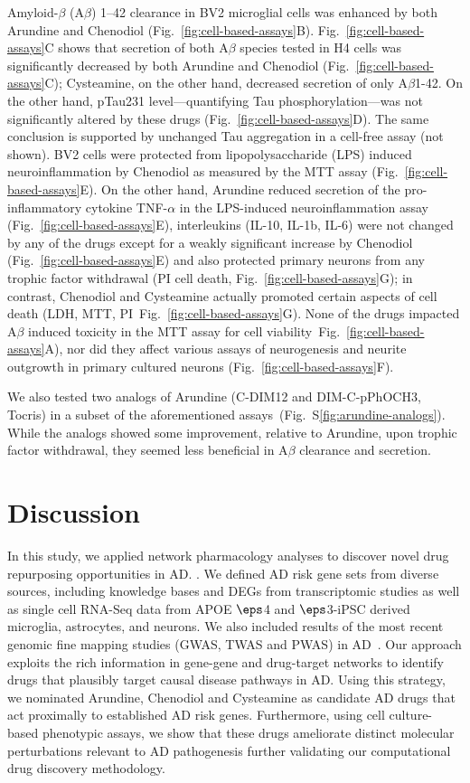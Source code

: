 \documentclass[letterpaper]{article}
\begin{document}
Amyloid-$\beta$ (A$\beta$) 1--42 clearance in BV2 microglial cells was
enhanced by both Arundine and Chenodiol (Fig.~\ref{fig:cell-based-assays}B).
Fig.~\ref{fig:cell-based-assays}C shows that secretion of both A$\beta$
species tested in H4 cells was significantly decreased by both Arundine and
Chenodiol (Fig.~\ref{fig:cell-based-assays}C); Cysteamine, on the other hand,
decreased secretion of only A$\beta$1-42.  On the other hand, pTau231
level---quantifying Tau phosphorylation---was not significantly altered by
these drugs (Fig.~\ref{fig:cell-based-assays}D).  The same conclusion is
supported by unchanged Tau aggregation in a cell-free assay (not shown). BV2
cells were protected from lipopolysaccharide (LPS) induced neuroinflammation
by Chenodiol as measured by the MTT assay (Fig.~\ref{fig:cell-based-assays}E).
On the other hand, Arundine reduced secretion of the pro-inflammatory cytokine
TNF-$\alpha$ in the LPS-induced neuroinflammation assay
(Fig.~\ref{fig:cell-based-assays}E), interleukins (IL-10, IL-1b, IL-6) were
not changed by any of the drugs except for a weakly significant increase by
Chenodiol (Fig.~\ref{fig:cell-based-assays}E) and also protected primary
neurons from any trophic factor withdrawal (PI cell death,
Fig.~\ref{fig:cell-based-assays}G); in contrast, Chenodiol and Cysteamine
actually promoted certain aspects of cell death (LDH, MTT,
PI~Fig.~\ref{fig:cell-based-assays}G).  None of the drugs impacted A$\beta$
induced toxicity in the MTT assay for cell
viability~Fig.~\ref{fig:cell-based-assays}A), nor did they affect various
assays of neurogenesis and neurite outgrowth in primary cultured neurons
(Fig.~\ref{fig:cell-based-assays}F).

We also tested two analogs of Arundine (C-DIM12 and DIM-C-pPhOCH3, Tocris) in a
subset of the aforementioned assays~(Fig.~S\ref{fig:arundine-analogs}).  While
the analogs showed some improvement, relative to Arundine, upon trophic factor
withdrawal, they seemed less beneficial in A$\beta$ clearance and secretion.

\section{Discussion}

In this study, we applied network pharmacology analyses to discover novel drug
repurposing opportunities in AD. .  We defined AD risk gene sets from diverse
sources, including knowledge bases and DEGs from transcriptomic studies as
well as single cell RNA-Seq data from APOE $\eps$4 and $\eps$3-iPSC derived microglia,
astrocytes, and neurons. We also included results of the most recent genomic
fine mapping studies (GWAS, TWAS and PWAS) in AD~\citep{Zhu2018,Lau2020}. Our
approach exploits the rich information in gene-gene and drug-target networks
to identify drugs that plausibly target causal disease pathways in AD. Using
this strategy, we nominated Arundine, Chenodiol and Cysteamine as candidate AD
drugs that act proximally to established AD risk genes. Furthermore, using
cell culture-based phenotypic assays, we show that these drugs ameliorate
distinct molecular perturbations relevant to AD pathogenesis further
validating our computational drug discovery methodology.
\end{document}
